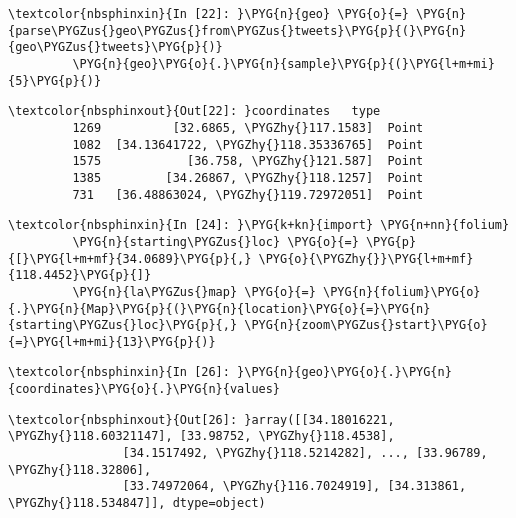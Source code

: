 \documentclass[letterpaper,10pt,english]{sphinxmanual}
\begin{document}
%
\begin{Verbatim}[commandchars=\\\{\}]
\textcolor{nbsphinxin}{In [22]: }\PYG{n}{geo} \PYG{o}{=} \PYG{n}{parse\PYGZus{}geo\PYGZus{}from\PYGZus{}tweets}\PYG{p}{(}\PYG{n}{geo\PYGZus{}tweets}\PYG{p}{)}
         \PYG{n}{geo}\PYG{o}{.}\PYG{n}{sample}\PYG{p}{(}\PYG{l+m+mi}{5}\PYG{p}{)}
\end{Verbatim}

%
\begin{Verbatim}[commandchars=\\\{\}]
\textcolor{nbsphinxout}{Out[22]: }coordinates   type
         1269          [32.6865, \PYGZhy{}117.1583]  Point
         1082  [34.13641722, \PYGZhy{}118.35336765]  Point
         1575            [36.758, \PYGZhy{}121.587]  Point
         1385         [34.26867, \PYGZhy{}118.1257]  Point
         731   [36.48863024, \PYGZhy{}119.72972051]  Point
\end{Verbatim}

%
\begin{Verbatim}[commandchars=\\\{\}]
\textcolor{nbsphinxin}{In [24]: }\PYG{k+kn}{import} \PYG{n+nn}{folium}
         \PYG{n}{starting\PYGZus{}loc} \PYG{o}{=} \PYG{p}{[}\PYG{l+m+mf}{34.0689}\PYG{p}{,} \PYG{o}{\PYGZhy{}}\PYG{l+m+mf}{118.4452}\PYG{p}{]}
         \PYG{n}{la\PYGZus{}map} \PYG{o}{=} \PYG{n}{folium}\PYG{o}{.}\PYG{n}{Map}\PYG{p}{(}\PYG{n}{location}\PYG{o}{=}\PYG{n}{starting\PYGZus{}loc}\PYG{p}{,} \PYG{n}{zoom\PYGZus{}start}\PYG{o}{=}\PYG{l+m+mi}{13}\PYG{p}{)}
\end{Verbatim}

%
\begin{Verbatim}[commandchars=\\\{\}]
\textcolor{nbsphinxin}{In [26]: }\PYG{n}{geo}\PYG{o}{.}\PYG{n}{coordinates}\PYG{o}{.}\PYG{n}{values}
\end{Verbatim}

%
\begin{Verbatim}[commandchars=\\\{\}]
\textcolor{nbsphinxout}{Out[26]: }array([[34.18016221, \PYGZhy{}118.60321147], [33.98752, \PYGZhy{}118.4538],
                [34.1517492, \PYGZhy{}118.5214282], ..., [33.96789, \PYGZhy{}118.32806],
                [33.74972064, \PYGZhy{}116.7024919], [34.313861, \PYGZhy{}118.534847]], dtype=object)
\end{Verbatim}
\end{document}
